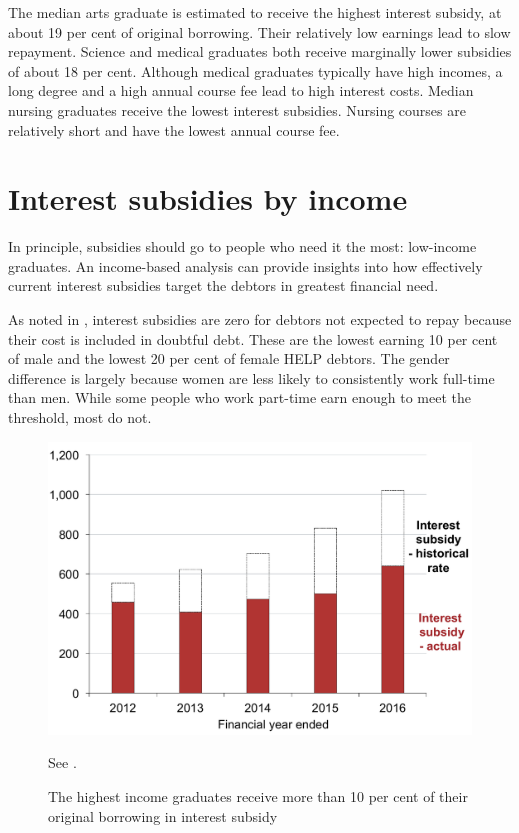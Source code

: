 \documentclass[embargoed]{grattan}
\begin{document}
The median arts graduate is estimated to receive the highest interest subsidy, at about 19 per cent of original borrowing.
Their relatively low earnings lead to slow repayment.
Science and medical graduates both receive marginally lower subsidies of about 18 per cent.
Although medical graduates typically have high incomes, a long degree and a high annual course fee lead to high interest costs.
Median nursing graduates receive the lowest interest subsidies.
Nursing courses are relatively short and have the lowest annual course fee.

\section{Interest subsidies by income}\label{sec:interest-subsidies-by-income}

In principle, subsidies should go to people who need it the most: low-income graduates.
An income-based analysis can provide insights into how effectively current interest subsidies target the debtors in greatest financial need.

As noted in , interest subsidies are zero for debtors not expected to repay because their cost is included in doubtful debt.
These are the lowest earning 10 per cent of male and the lowest 20 per cent of female \gls{HELP} debtors.
The gender difference is largely because women are less likely to consistently work full-time than men.
While some people who work part-time earn enough to meet the threshold, most do not.

\begin{figure}
\caption{The highest income graduates receive more than 10 per cent of their original borrowing in interest subsidy}\label{fig:fig10-highest-income-grads-receive-over-10pc-original-borrowing-interest-subsidy}

\includegraphics[page=10]{atlas/Chartpack.pdf}

%
{{See .}}
\end{figure}
\end{document}

